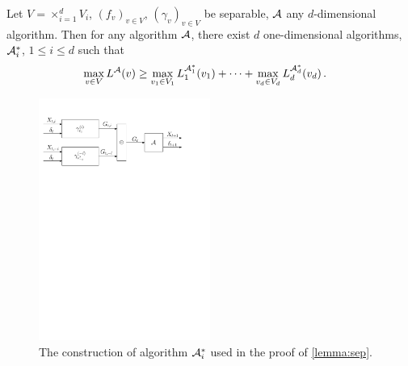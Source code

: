 \begin{lemma}
\label{lemma:sep}
Let $V= \times_{i=1}^d V_i$, $(f_v)_{v\in V}$, $(\gamma_v)_{v\in V}$ be separable, $\mathcal{A}$ any $d$-dimensional algorithm. Then
for any algorithm $\mathcal{A}$, there exist  $d$ one-dimensional algorithms, $\mathcal{A}_i^*$, $1\le i \le d$
such that 
\begin{align}
\label{eq:onedimlb}
&\max_{v\in V} L^{\mathcal{A}}(v) 
\ge   \max_{v_1\in V_1} L_1^{\mathcal{A}_1^*}(v_1) + \dots + \max_{v_d\in V_d} L_d^{\mathcal{A}^*_d}(v_d)\,.
\end{align}
\end{lemma}
\begin{figure}
\begin{center}
	\includegraphics[width=0.5\textwidth]{../figs/ddimto1dim_reduction} %
\end{center}
\caption{The construction of algorithm $\mathcal{A}_i^*$ used in the proof of \cref{lemma:sep}.}
\label{fig:sepalgconstruction}
\end{figure}
